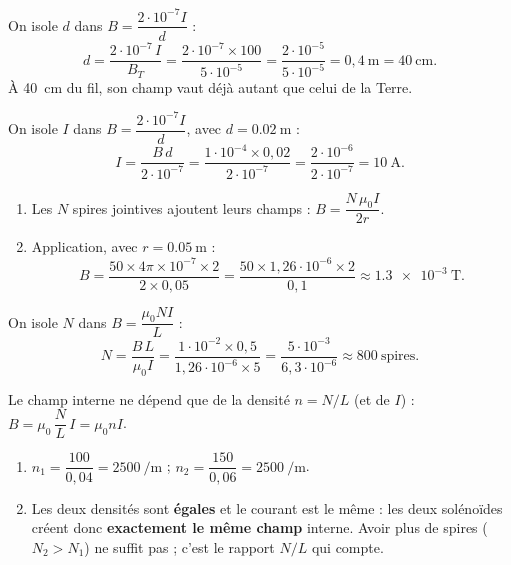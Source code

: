 \documentclass[11pt,a4paper]{article}
\begin{document}
\begin{corrige}
On isole $d$ dans $B=\dfrac{2\cdot10^{-7} I}{d}$ :
\[ d=\frac{2\cdot10^{-7}\,I}{B_T}=\frac{2\cdot10^{-7}\times100}{5\cdot10^{-5}}
    =\frac{2\cdot10^{-5}}{5\cdot10^{-5}}=0{,}4\ \si{\metre}=\qty{40}{\centi\metre}. \]
À \qty{40}{\centi\metre} du fil, son champ vaut déjà autant que celui de la Terre.
\end{corrige}

\begin{corrige}
On isole $I$ dans $B=\dfrac{2\cdot10^{-7} I}{d}$, avec $d=\qty{0.02}{\metre}$ :
\[ I=\frac{B\,d}{2\cdot10^{-7}}=\frac{1\cdot10^{-4}\times0{,}02}{2\cdot10^{-7}}
    =\frac{2\cdot10^{-6}}{2\cdot10^{-7}}=\qty{10}{\ampere}. \]
\end{corrige}

\begin{corrige}
\begin{enumerate}[label=\alph*)]
  \item Les $N$ spires jointives ajoutent leurs champs : $B=\dfrac{N\,\mu_0 I}{2r}$.
  \item Application, avec $r=\qty{0.05}{\metre}$ :
        \[ B=\frac{50\times4\pi\times10^{-7}\times2}{2\times0{,}05}
            =\frac{50\times1{,}26\cdot10^{-6}\times2}{0{,}1}\approx\qty{1.3e-3}{\tesla}. \]
\end{enumerate}
\end{corrige}

\begin{corrige}
On isole $N$ dans $B=\dfrac{\mu_0 N I}{L}$ :
\[ N=\frac{B\,L}{\mu_0 I}=\frac{1\cdot10^{-2}\times0{,}5}{1{,}26\cdot10^{-6}\times5}
    =\frac{5\cdot10^{-3}}{6{,}3\cdot10^{-6}}\approx 800\ \text{spires}. \]
\end{corrige}

\begin{corrige}
Le champ interne ne dépend que de la densité $n=N/L$ (et de $I$) : $B=\mu_0\,\dfrac{N}{L}\,I=\mu_0 n I$.
\begin{enumerate}[label=\alph*)]
  \item $n_1=\dfrac{100}{0{,}04}=\qty{2500}{\per\metre}$ ; \quad
        $n_2=\dfrac{150}{0{,}06}=\qty{2500}{\per\metre}$.
  \item Les deux densités sont \textbf{égales} et le courant est le même : les deux solénoïdes créent
        donc \textbf{exactement le même champ} interne. Avoir plus de spires ($N_2>N_1$) ne suffit
        pas ; c'est le rapport $N/L$ qui compte.
\end{enumerate}
\end{corrige}
\end{document}

